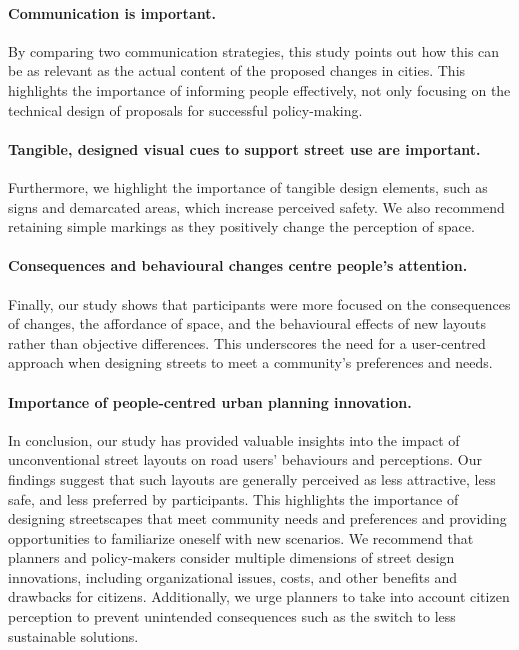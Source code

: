 \paragraph{Communication is important.} By comparing two communication strategies, this study points out how this can be as relevant as the actual content of the proposed changes in cities. This highlights the importance of informing people effectively, not only focusing on the technical design of proposals for successful policy-making.

\paragraph{Tangible, designed visual cues to support street use are important.} Furthermore, we highlight the importance of tangible design elements, such as signs and demarcated areas, which increase perceived safety. We also recommend retaining simple markings as they positively change the perception of space.

\paragraph{Consequences and behavioural changes centre people's attention.} Finally, our study shows that participants were more focused on the consequences of changes, the affordance of space, and the behavioural effects of new layouts rather than objective differences. This underscores the need for a user-centred approach when designing streets to meet a community's preferences and needs.

\paragraph{Importance of people-centred urban planning innovation.} In conclusion, our study has provided valuable insights into the impact of unconventional street layouts on road users' behaviours and perceptions. Our findings suggest that such layouts are generally perceived as less attractive, less safe, and less preferred by participants. This highlights the importance of designing streetscapes that meet community needs and preferences and providing opportunities to familiarize oneself with new scenarios.
We recommend that planners and policy-makers consider multiple dimensions of street design innovations, including organizational issues, costs, and other benefits and drawbacks for citizens. Additionally, we urge planners to take into account citizen perception to prevent unintended consequences such as the switch to less sustainable solutions. 

